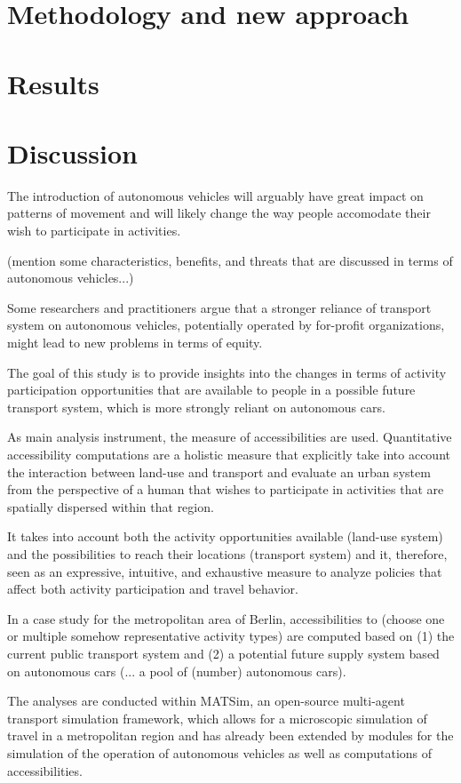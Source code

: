 \documentclass[10pt]{article}
\begin{document}
\section{Methodology and new approach}
\section{Results}
\section{Discussion}

The introduction of autonomous vehicles will arguably have great impact on patterns of movement and will likely change the way people accomodate their wish to participate in activities.

(mention some characteristics, benefits, and threats that are discussed in terms of autonomous vehicles...)

Some researchers and practitioners argue that a stronger reliance of transport system on autonomous vehicles, potentially operated by for-profit organizations, might lead to new problems in terms of equity.

The goal of this study is to provide insights into the changes in terms of activity participation opportunities that are available to people in a possible future transport system, which is more strongly reliant on autonomous cars.

As main analysis instrument, the measure of accessibilities are used. Quantitative accessibility computations are a holistic measure that explicitly take into account the interaction between land-use and transport and evaluate an urban system from the perspective of a human that wishes to participate in activities that are spatially dispersed within that region.

It takes into account both the activity opportunities available (land-use system) and the possibilities to reach their locations (transport system) and it, therefore, seen as an expressive, intuitive, and exhaustive measure to analyze policies that affect both activity participation and travel behavior.

In a case study for the metropolitan area of Berlin, accessibilities to (choose one or multiple somehow representative activity types) are computed based on (1) the current public transport system and (2) a potential future supply system based on autonomous cars (... a pool of (number) autonomous cars).

The analyses are conducted within MATSim, an open-source multi-agent transport simulation framework, which allows for a microscopic simulation of travel in a metropolitan region and has already been extended by modules for the simulation of the operation of autonomous vehicles as well as computations of accessibilities.
\end{document}

